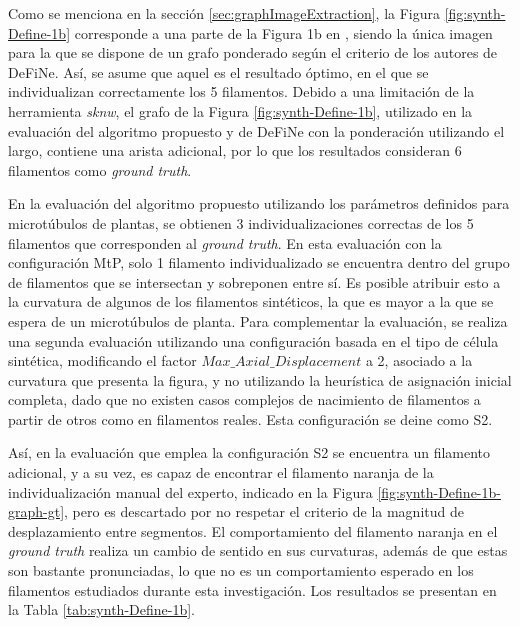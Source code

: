 
Como se menciona en la secci\'on \ref{sec:graphImageExtraction}, la Figura \ref{fig:synth-Define-1b} corresponde a una parte de la Figura 1b en \citet{breuer2015define}, siendo la \'unica imagen para la que se dispone de un grafo ponderado seg\'un el criterio de los autores de DeFiNe. As\'i, se asume que aquel es el resultado \'optimo, en el que se individualizan correctamente los 5 filamentos. Debido a una limitaci\'on de la herramienta {\it sknw}, el grafo de la Figura \ref{fig:synth-Define-1b}, utilizado en la evaluaci\'on del algoritmo propuesto y de DeFiNe con la ponderaci\'on utilizando el largo, contiene una arista adicional, por lo que los resultados consideran 6 filamentos como {\it ground truth}.


En la evaluaci\'on del algoritmo propuesto utilizando los par\'ametros definidos para microt\'ubulos de plantas, se obtienen 3 individualizaciones correctas de los 5 filamentos que corresponden al {\it ground truth}. En esta evaluaci\'on con la configuraci\'on MtP, solo 1 filamento individualizado se encuentra dentro del grupo de filamentos que se intersectan y sobreponen entre s\'i. Es posible atribuir esto a la curvatura de algunos de los filamentos sint\'eticos, la que es mayor a la que se espera de un microt\'ubulos de planta. Para complementar la evaluaci\'on, se realiza una segunda evaluaci\'on utilizando una configuraci\'on basada en el tipo de c\'elula sint\'etica, modificando el factor $Max\_Axial\_Displacement$ a 2, asociado a la curvatura que presenta la figura, y no utilizando la heur\'istica de asignaci\'on inicial completa, dado que no existen casos complejos de nacimiento de filamentos a partir de otros como en filamentos reales. Esta configuraci\'on se deine como S2.

As\'i, en la evaluaci\'on que emplea la configuraci\'on S2 se encuentra un filamento adicional, y a su vez, es capaz de encontrar el filamento naranja de la individualizaci\'on manual del experto, indicado en la Figura \ref{fig:synth-Define-1b-graph-gt}, pero es descartado por no respetar el criterio de la magnitud de desplazamiento entre segmentos. El comportamiento del filamento naranja en el {\it ground truth} realiza un cambio de sentido en sus curvaturas, adem\'as de que estas son bastante pronunciadas, lo que no es un comportamiento esperado en los filamentos estudiados durante esta investigaci\'on. Los resultados se presentan en la Tabla \ref{tab:synth-Define-1b}.




